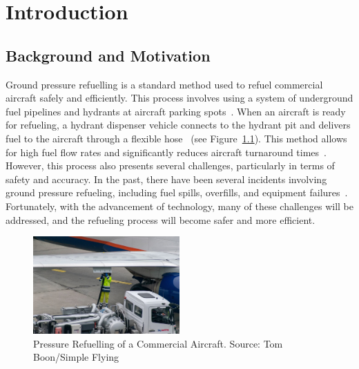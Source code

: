 \documentclass[12pt,oneside]{book} %
\begin{document}
%
%
\mainmatter\pagestyle{fancy}
\fancyhead[L]{\nouppercase{\leftmark}}
\fancyhead[R]{\nouppercase{\rightmark}}

\chapter{Introduction}
\section{Background and Motivation}

Ground pressure refuelling is a standard method used to refuel commercial
aircraft safely and efficiently. This process involves using a system of
underground fuel pipelines and hydrants at aircraft parking
spots~\cite{blakey2011aviation}. When an aircraft is ready for refueling, a
hydrant dispenser vehicle connects to the hydrant pit and delivers fuel to the
aircraft through a flexible hose~\cite{sati2019aircraft} (see
Figure~\ref{fig:pressure-refuelling}). This method allows for high fuel flow
rates and significantly reduces aircraft turnaround
times~\cite{blakey2011aviation}. However, this process also presents several
challenges, particularly in terms of safety and accuracy. In the past, there
have been several incidents involving ground pressure refueling, including fuel
spills, overfills, and equipment
failures~\cite{doi:10.1080/13669877.2013.879493, CostsOfUnsafetyAviation}.
Fortunately, with the advancement of technology, many of these challenges will
be addressed, and the refueling process will become safer and more efficient. 

\begin{figure}[H]
    \centering
    \includegraphics[width=0.5\textwidth]{figures/pressure-refuelling.jpeg}
    \caption{Pressure Refuelling of a Commercial Aircraft. Source: Tom Boon/Simple Flying}\label{fig:pressure-refuelling}
\end{figure}
\end{document}
